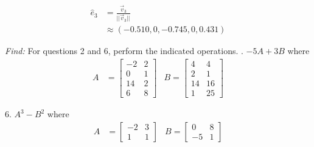 \documentclass[11pt]{homework}
\begin{document}
\begin{align*}
\hat{e}_3 &= \frac{\vec v_3}{||\vec v_3||} \\
          &\approx (-0.510, 0, -0.745, 0, 0.431)
\end{align*}

\newpage
{}
\emph{Find:}
\newline
For questions 2 and 6, perform the indicated operations.
. $-5A + 3B$ where
\begin{align*}
A &= 
 \begin{bmatrix}
  -2 & 2 \\
  0 & 1 \\
  14 & 2 \\
  6 & 8 
 \end{bmatrix}
&B =
 \begin{bmatrix}
  4 & 4 \\
  2 & 1 \\
  14 & 16 \\
  1 & 25
 \end{bmatrix}
\end{align*}

6. $A^3 - B^2$ where
\begin{align*}
A &= 
 \begin{bmatrix}
  -2 & 3 \\
  1 & 1 
 \end{bmatrix}
&B = 
 \begin{bmatrix}
  0 & 8 \\
  -5 & 1 
 \end{bmatrix}
\end{align*}
\end{document}
